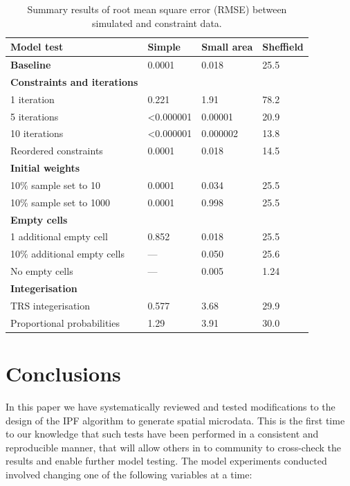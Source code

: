 \documentclass[a4paper,10pt]{article}
\begin{document}
\begin{table}[h]
\caption{Summary results of root mean square error (RMSE) between
simulated and constraint data.} \label{tsum}
\begin{center}
\begin{tabular}{llll}
\toprule
Model test & Simple & Small area  & Sheffield \\
\midrule
\textbf{Baseline} & 0.0001 & 0.018  & 25.5 \\
\midrule
\textbf{Constraints and iterations} &  &  & \\
1 iteration & 0.221 & 1.91 & 78.2 \\
5 iterations & \textless 0.000001 & 0.00001  & 20.9 \\
10 iterations & \textless 0.000001 & 0.000002  & 13.8 \\
Reordered constraints 		& 0.0001  & 0.018 & 14.5 \\ %
\midrule
\textbf{Initial weights} 	&  &  & \\
10\% sample set to 10  		& 0.0001 & 0.034  & 25.5\\
10\% sample set to 1000 	& 0.0001 & 0.998 & 25.5 \\
\midrule
\textbf{Empty cells} 		&  &  & \\
1 additional empty cell 	& 0.852 & 0.018  & 25.5 \\
10\% additional empty cells 	& --- & 0.050  & 25.6 \\
No empty cells			& --- & 0.005 & 1.24 \\
\midrule
\textbf{Integerisation} 	&  &  & \\
TRS integerisation		& 0.577 & 3.68  & 29.9 \\
Proportional probabilities & 1.29 & 3.91 & 30.0 \\
\bottomrule
\end{tabular}
\end{center}
\end{table}



\section{Conclusions}
In this paper we have systematically reviewed and tested modifications to the
design of the IPF algorithm to generate spatial microdata. This is the first time
to our knowledge that such tests have been performed in a consistent and reproducible
manner, that will allow others in to community to cross-check the results and enable
further model testing. The model experiments conducted involved changing one of the
following variables at a time:
\end{document}
